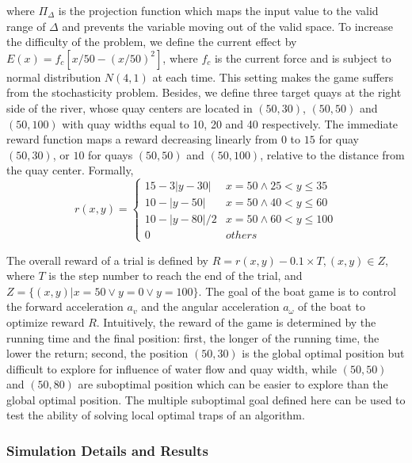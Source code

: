 \documentclass[journal,transmag]{IEEEtran}
\begin{document}
where $\Pi_\Delta$ is the projection function which maps the input value to the valid range of $\Delta$ and prevents the variable moving out of the valid space. %
To increase the difficulty of the problem, we define the current effect by $E(x)={f_c}[x/50-{(x/50)}^2]$, where $f_c$ is the current force and is subject to normal distribution $N(4,1)$ at each time. This setting makes the game suffers from the stochasticity problem. Besides, we define three target quays at the right side of the river, whose quay centers are located in $(50,30)$, $(50, 50)$ and $(50,100)$ with quay widths equal to 10, 20 and 40 respectively. The immediate reward function maps a reward decreasing linearly from $0$ to $15$ for quay $(50, 30)$, or $10$ for quays $(50, 50)$ and $(50,100)$, relative to the distance from the quay center. Formally,
\[
r(x,y) = \left\{ {\begin{array}{*{20}{c}}
{15 - 3|y - 30|}&{x = 50 \wedge 25 < y \le 35}\\
{10 - |y - 50|}&{x = 50 \wedge 40 < y \le 60}\\
{10 - |y - 80|/2}&{x = 50 \wedge 60 < y \le 100}\\
0&{others}
\end{array}} \right.
\]

The overall reward of a trial is defined by $R=r(x,y)-0.1\times T, (x,y)\in Z$, where $T$ is the step number to reach the end of the trial, and $Z=\{(x,y)|x=50 \vee y=0 \vee y=100\}$. The goal of the boat game is to control the forward acceleration $a_v$ and the angular acceleration $a_\omega$ of the boat to optimize reward $R$. Intuitively, the reward of the game is determined by the running time and the final position: first, the longer of the running time, the lower the return; second, the position $(50,30)$ is the global optimal position but difficult to explore for influence of water flow and quay width, while $(50,50)$ and $(50,80)$ are suboptimal position which can be easier to explore than the global optimal position. The multiple suboptimal goal defined here can be used to test the ability of solving local optimal traps of an algorithm.

\subsubsection{Simulation Details and Results}
\end{document}
